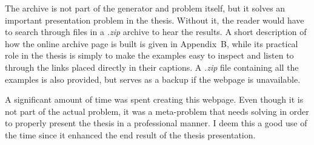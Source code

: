 The archive is not part of the generator and problem itself, but it solves an important presentation problem in the thesis. Without it, the reader would have to search through files in a \textit{.zip} archive to hear the results. A short description of how the online archive page is built is given in Appendix~B, while its practical role in the thesis is simply to make the examples easy to inspect and listen to through the links placed directly in their captions. A \textit{.zip} file containing all the examples is also provided, but serves as a backup if the webpage is unavailable.

A significant amount of time was spent creating this webpage. Even though it is not part of the actual problem, it was a meta-problem that needs solving in order to properly present the thesis in a professional manner. I deem this a good use of the time since it enhanced the end result of the thesis presentation.
